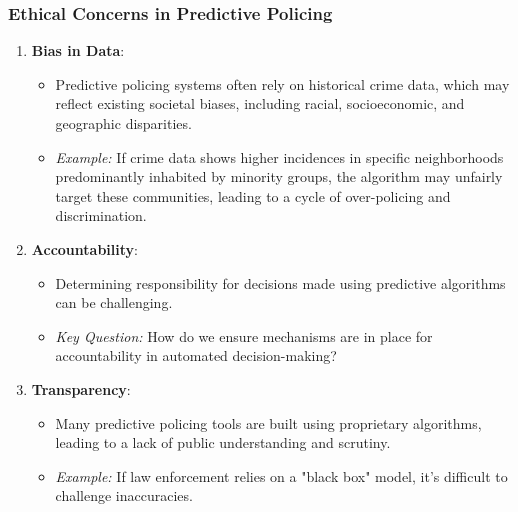 \documentclass[aspectratio=169]{beamer}
\begin{document}
\begin{frame}[fragile]
    \frametitle{Ethical Concerns in Predictive Policing}
    \begin{enumerate}
        \item \textbf{Bias in Data}:
            \begin{itemize}
                \item Predictive policing systems often rely on historical crime data, which may reflect existing societal biases, including racial, socioeconomic, and geographic disparities.
                \item \textit{Example:} If crime data shows higher incidences in specific neighborhoods predominantly inhabited by minority groups, the algorithm may unfairly target these communities, leading to a cycle of over-policing and discrimination.
            \end{itemize}
        
        \item \textbf{Accountability}:
            \begin{itemize}
                \item Determining responsibility for decisions made using predictive algorithms can be challenging.
                \item \textit{Key Question:} How do we ensure mechanisms are in place for accountability in automated decision-making?
            \end{itemize}

        \item \textbf{Transparency}:
            \begin{itemize}
                \item Many predictive policing tools are built using proprietary algorithms, leading to a lack of public understanding and scrutiny.
                \item \textit{Example:} If law enforcement relies on a "black box" model, it's difficult to challenge inaccuracies.
            \end{itemize}
    \end{enumerate}
\end{frame}
\end{document}
